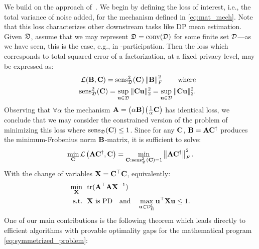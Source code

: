 \documentclass{article} %
\theoremstyle{named}
\begin{document}
We build on the approach of~\citet{denisov22matfact}. We begin by defining the loss of interest, i.e., the total variance of noise added, for the mechanism defined in \cref{eq:mat_mech}. Note that this loss characterizes other downstream tasks like DP mean estimation. Given $\mathfrak{D}$, assume that we may represent $\mathfrak{D} = \operatorname{conv}(\mathcal{D})$ for some finite set $\mathcal{D}$---as we have seen, this is the case, e.g., in \multiepoch-participation. Then the loss which corresponds to total squared error of a factorization, at a fixed privacy level, may be expressed as: 
\begin{equation}\label{eq:l_expression}
\begin{aligned}
  \mathcal{L}(\mathbf{B}, \mathbf{C}) = \operatorname{sens}_{\mathfrak{D}}^2(\mathbf{C}) \left\|\mathbf{B}\right\|_F^2
  \qquad \text{where}\\
  \qquad \operatorname{sens}_{\mathfrak{D}}^2(\mathbf{C}) = \sup_{\mathbf{u} \in \mathfrak{D}} \| \mathbf{C}\mathbf{u} \|_2^2 = \sup_{\mathbf{u} \in \mathcal{D}} \| \mathbf{C}\mathbf{u} \|_2^2.
 \end{aligned}
\end{equation}
Observing that $\forall\alpha$ the mechanism $\mathbf{A} = \big(\alpha\mathbf{B}\big)\big(\frac{1}{\alpha}\mathbf{C}\big)$ has identical loss, we conclude that we may consider the constrained version of the problem of minimizing this loss where $\operatorname{sens}_{\mathfrak{D}}(\mathbf{C}) \le 1$.
Since for any $\mathbf{C}$, $\mathbf{B} = \mathbf{A}\mathbf{C}^\dagger$ produces the minimum-Frobenius norm $\mathbf{B}$-matrix, it is sufficient to solve:
\begin{equation}\label{eq:constrained_problem}
\min_{\mathbf{C}} \mathcal{L}\left(\mathbf{A}\mathbf{C}^\dagger, \mathbf{C}\right) 
    = \min_{\mathbf{C}: \operatorname{sens}_{\mathfrak{D}}^2(\mathbf{C}) = 1} \left\|\mathbf{A}\mathbf{C}^\dagger\right\|_F^2.
\end{equation}
With the change of variables $\mathbf{X} = \mathbf{C}^\top\mathbf{C}$, equivalently: 
\begin{align}
    \min_\bfX\ \  &\tr(\AAT \bfX^{-1})  \label{eq:symmetrized_problem}\\    
    \text{s.t.}\ \  &  \bfX \text{ is PD} %
    \quad \text{and} \quad 
    \max_{\contrib \in \Dcorners^1_\Pi} \contrib\tp \bfX \contrib \le 1. \notag
\end{align}
One of our main contributions is the following theorem which leads directly to efficient algorithms with provable optimality gaps for the mathematical program \cref{eq:symmetrized_problem}:
\end{document}
